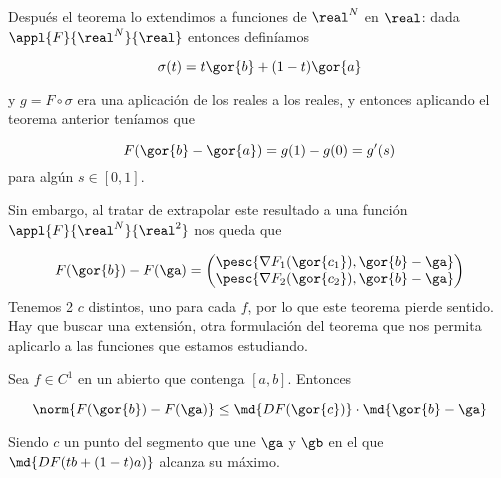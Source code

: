 Después el teorema lo extendimos a funciones de $\real^N$ en $\real$: dada $\appl{F}{\real^N}{\real}$ entonces definíamos
 
 \[ \sigma(t)  = t\gor{b}+(1-t)\gor{a} \] 
 
 y $g = F\circ \sigma$ era una aplicación de los reales a los reales, y entonces aplicando el teorema anterior teníamos que 
 
 \[ F(\gor{b}-\gor{a}) = g(1)-g(0)  = g'(s) \] 
 para algún $s\in[0,1]$.

Sin embargo, al tratar de extrapolar este resultado a una función $\appl{F}{\real^N}{\real^2}$ nos queda que 

 \[ F(\gor{b})-F(\ga) = \begin{pmatrix}
                         \pesc{\nabla F_1(\gor{c_1}),{\gor{b}-\ga}}\\
                         \pesc{\nabla F_2(\gor{c_2}),\gor{b}-\ga}
                        \end{pmatrix}
 \]
  Tenemos 2 $c$ distintos, uno para cada $f$, por lo que este teorema pierde sentido. Hay que buscar una extensión, otra formulación del teorema que nos permita aplicarlo a las funciones que estamos estudiando.
  
  \begin{theorem} 
  \label{thmTVM}
  Sea $f \in C^1$ en un abierto que contenga $[a,b]$. Entonces 
  
  \[ \norm{F(\gor{b})-F(\ga)} \leq \md{DF(\gor{c})} \cdot \md{\gor{b}-\ga} \]
  
  Siendo $c$ un punto del segmento que une $\ga$ y $\gb$ en el que $\md{DF(tb+(1-t)a)}$ alcanza su máximo.
  \end{theorem}  
  
